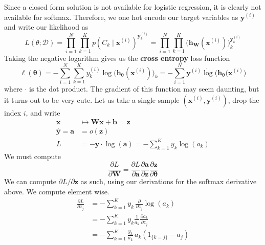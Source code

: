 \documentclass{article}
\begin{document}
  \begin{theorem}
    Since a closed form solution is not available for logistic regression, it is clearly not available for softmax. Therefore, we one hot encode our target variables as $\mathbf{y}^{(i)}$ and write our likelihood as 
    \begin{equation}
      L(\theta; \mathcal{D}) = \prod_{i=1}^N \prod_{k=1}^K p(C_k \mid \mathbf{x}^{(i)})^{\mathbf{y}^{(i)}_k} = \prod_{i=1}^N \prod_{k=1}^K \big( \mathbf{h}_\mathbf{W} (\mathbf{x}^{(i)})\big)_k^{\mathbf{y}_k^{(i)}}
    \end{equation}
    Taking the negative logarithm gives us the \textbf{cross entropy} loss function
    \begin{equation}
      \ell (\boldsymbol{\theta}) = - \sum_{i=1}^N \sum_{k=1}^K y^{(i)}_k \log \big( \mathbf{h}_{\boldsymbol{\theta}} (\mathbf{x}^{(i)})\big)_k = - \sum_{i=1}^N \mathbf{y}^{(i)} \dot \log \big( \mathbf{h}_{\boldsymbol{\theta}} (\mathbf{x}^{(i)} \big)
    \end{equation}
    where $\cdot$ is the dot product. The gradient of this function may seem daunting, but it turns out to be very cute. Let us take a single sample $(\mathbf{x}^{(i)}, \mathbf{y}^{(i)})$, drop the index $i$, and write
    \begin{align*}
      \mathbf{x} & \mapsto \mathbf{W} \mathbf{x} + \mathbf{b} = \mathbf{z} \\
      \hat{\mathbf{y}} = \mathbf{a} & = o (\mathbf{z}) \\
      L & = - \mathbf{y} \cdot \log (\mathbf{a}) = - \sum_{k=1}^K y_k \log(a_k)
    \end{align*}
    We must compute 
    \begin{equation}
      \frac{\partial L}{\partial \mathbf{W}} = \frac{\partial L}{\partial \mathbf{a}} \frac{\partial \mathbf{a}}{\partial \mathbf{z}} \frac{\partial \mathbf{z}}{\partial \boldsymbol{\theta}}
    \end{equation}
    We can compute $\partial L /\partial \mathbf{z}$ as such, using our derivations for the softmax derivative above. We compute element wise. 
    \begin{align*}
      \frac{\partial L}{\partial z_j} & = - \sum_{k=1}^K y_k \, \frac{\partial}{\partial z_j} \log (a_k) \\
      & = - \sum_{k=1}^K y_k \frac{1}{a_k} \frac{\partial a_k}{\partial z_j} \\
      & = - \sum_{k=1}^K \frac{y_k}{a_k} \, a_k (1_{\{k = j\}} - a_j) \\

\end{align*}
\end{theorem}
\end{document}
